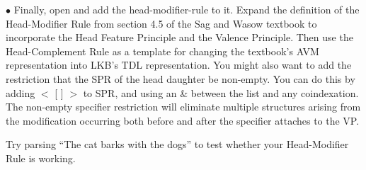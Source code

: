 $\bullet$ Finally, open  and add the head-modifier-rule to it.  Expand the definition of the Head-Modifier Rule from section 4.5 of the Sag and Wasow textbook to incorporate the Head Feature Principle and the Valence Principle.  Then use the Head-Complement Rule as a template for changing the textbook's AVM representation into LKB's TDL representation.  You might also want to add the restriction that the SPR of the head daughter be non-empty.  You can do this by adding $<$ [ ] $>$ to SPR, and using an \& between the list and any coindexation.  The non-empty specifier restriction will eliminate multiple structures arising from the modification occurring both before and after the specifier attaches to the VP.

Try parsing ``The cat barks with the dogs'' to test whether your Head-Modifier Rule is working.


